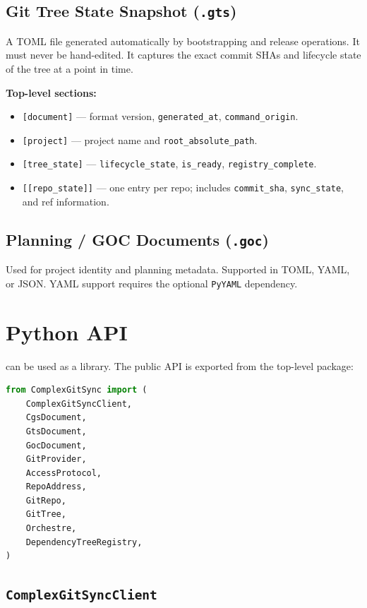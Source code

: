 \documentclass[11pt,a4paper]{article}
\begin{document}
\subsection{Git Tree State Snapshot (\texttt{.gts})}

A TOML file generated automatically by bootstrapping and release operations.
It must never be hand-edited. It captures the exact commit SHAs and lifecycle
state of the tree at a point in time.

\textbf{Top-level sections:}
\begin{itemize}
  \item \texttt{[document]} — format version, \texttt{generated\_at},
        \texttt{command\_origin}.
  \item \texttt{[project]} — project name and \texttt{root\_absolute\_path}.
  \item \texttt{[tree\_state]} — \texttt{lifecycle\_state}, \texttt{is\_ready},
        \texttt{registry\_complete}.
  \item \texttt{[[repo\_state]]} — one entry per repo; includes
        \texttt{commit\_sha}, \texttt{sync\_state}, and ref information.
\end{itemize}

\subsection{Planning / GOC Documents (\texttt{.goc})}

Used for project identity and planning metadata. Supported in TOML, YAML, or
JSON. YAML support requires the optional \texttt{PyYAML} dependency.

\section{Python API}

\cgspkg{} can be used as a library. The public API is exported from the
top-level package:

\begin{lstlisting}[language=Python]
from ComplexGitSync import (
    ComplexGitSyncClient,
    CgsDocument,
    GtsDocument,
    GocDocument,
    GitProvider,
    AccessProtocol,
    RepoAddress,
    GitRepo,
    GitTree,
    Orchestre,
    DependencyTreeRegistry,
)
\end{lstlisting}

\subsection{\texttt{ComplexGitSyncClient}}
\end{document}
